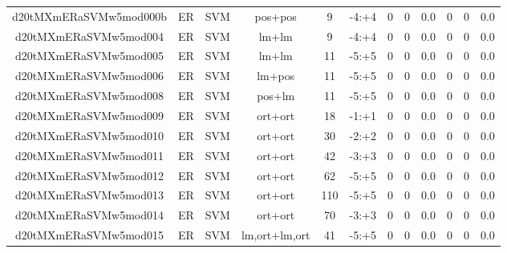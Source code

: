 \documentclass[a4paper]{article}
\begin{document}
\begin{landscape}
\begin{center}
\begin{tabular}{ |c|c|c|c|c|c|c|c|c|c|c|c|}
 
 	
 	\small{ d20tMXmERaSVMw5mod000b } & ER & SVM & pos+pos  &  9 &  -4:+4  &  0 & 0 & 0.0  &  0 & 0 & 0.0 \\
 	

 
 	
 	\small{ d20tMXmERaSVMw5mod004 } & ER & SVM & lm+lm  &  9 &  -4:+4  &  0 & 0 & 0.0  &  0 & 0 & 0.0 \\
 	

 
 	
 	\small{ d20tMXmERaSVMw5mod005 } & ER & SVM & lm+lm  &  11 &  -5:+5  &  0 & 0 & 0.0  &  0 & 0 & 0.0 \\
 	

 
 	
 	\small{ d20tMXmERaSVMw5mod006 } & ER & SVM & lm+pos  &  11 &  -5:+5  &  0 & 0 & 0.0  &  0 & 0 & 0.0 \\
 	

 
 	
 	\small{ d20tMXmERaSVMw5mod008 } & ER & SVM & pos+lm  &  11 &  -5:+5  &  0 & 0 & 0.0  &  0 & 0 & 0.0 \\
 	

 
 	
 	\small{ d20tMXmERaSVMw5mod009 } & ER & SVM & ort+ort  &  18 &  -1:+1  &  0 & 0 & 0.0  &  0 & 0 & 0.0 \\
 	

 
 	
 	\small{ d20tMXmERaSVMw5mod010 } & ER & SVM & ort+ort  &  30 &  -2:+2  &  0 & 0 & 0.0  &  0 & 0 & 0.0 \\
 	

 
 	
 	\small{ d20tMXmERaSVMw5mod011 } & ER & SVM & ort+ort  &  42 &  -3:+3  &  0 & 0 & 0.0  &  0 & 0 & 0.0 \\
 	

 
 	
 	\small{ d20tMXmERaSVMw5mod012 } & ER & SVM & ort+ort  &  62 &  -5:+5  &  0 & 0 & 0.0  &  0 & 0 & 0.0 \\
 	

 
 	
 	\small{ d20tMXmERaSVMw5mod013 } & ER & SVM & ort+ort  &  110 &  -5:+5  &  0 & 0 & 0.0  &  0 & 0 & 0.0 \\
 	

 
 	
 	\small{ d20tMXmERaSVMw5mod014 } & ER & SVM & ort+ort  &  70 &  -3:+3  &  0 & 0 & 0.0  &  0 & 0 & 0.0 \\
 	

 
 	
 	\small{ d20tMXmERaSVMw5mod015 } & ER & SVM & lm,ort+lm,ort  &  41 &  -5:+5  &  0 & 0 & 0.0  &  0 & 0 & 0.0 \\
 	


\end{tabular}
\end{center}
\end{landscape}
\end{document}
